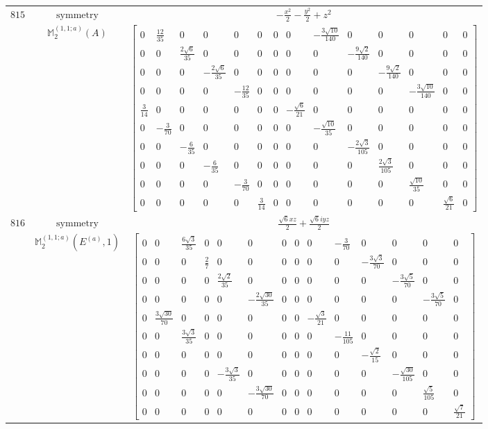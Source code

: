 \documentclass[fleqn,8pt,landscape]{jsarticle}
\begin{document}
\begin{longtable}{ccc}
$ 815 $ & $ \text{symmetry} $ & $ - \frac{x^{2}}{2} - \frac{y^{2}}{2} + z^{2} $ \\
$  $ & $ \mathbb{M}_{2}^{(1,1;a)}(A) $ & $ \begin{bmatrix} 0 & \frac{12}{35} & 0 & 0 & 0 & 0 & 0 & 0 & - \frac{3 \sqrt{10}}{140} & 0 & 0 & 0 & 0 & 0 \\ 0 & 0 & \frac{2 \sqrt{6}}{35} & 0 & 0 & 0 & 0 & 0 & 0 & - \frac{9 \sqrt{2}}{140} & 0 & 0 & 0 & 0 \\ 0 & 0 & 0 & - \frac{2 \sqrt{6}}{35} & 0 & 0 & 0 & 0 & 0 & 0 & - \frac{9 \sqrt{2}}{140} & 0 & 0 & 0 \\ 0 & 0 & 0 & 0 & - \frac{12}{35} & 0 & 0 & 0 & 0 & 0 & 0 & - \frac{3 \sqrt{10}}{140} & 0 & 0 \\ \frac{3}{14} & 0 & 0 & 0 & 0 & 0 & 0 & - \frac{\sqrt{6}}{21} & 0 & 0 & 0 & 0 & 0 & 0 \\ 0 & - \frac{3}{70} & 0 & 0 & 0 & 0 & 0 & 0 & - \frac{\sqrt{10}}{35} & 0 & 0 & 0 & 0 & 0 \\ 0 & 0 & - \frac{6}{35} & 0 & 0 & 0 & 0 & 0 & 0 & - \frac{2 \sqrt{3}}{105} & 0 & 0 & 0 & 0 \\ 0 & 0 & 0 & - \frac{6}{35} & 0 & 0 & 0 & 0 & 0 & 0 & \frac{2 \sqrt{3}}{105} & 0 & 0 & 0 \\ 0 & 0 & 0 & 0 & - \frac{3}{70} & 0 & 0 & 0 & 0 & 0 & 0 & \frac{\sqrt{10}}{35} & 0 & 0 \\ 0 & 0 & 0 & 0 & 0 & \frac{3}{14} & 0 & 0 & 0 & 0 & 0 & 0 & \frac{\sqrt{6}}{21} & 0 \end{bmatrix} $ \\ \hline
$ 816 $ & $ \text{symmetry} $ & $ \frac{\sqrt{6} x z}{2} + \frac{\sqrt{6} i y z}{2} $ \\
$  $ & $ \mathbb{M}_{2}^{(1,1;a)}(E^{(a)},1) $ & $ \begin{bmatrix} 0 & 0 & \frac{6 \sqrt{3}}{35} & 0 & 0 & 0 & 0 & 0 & 0 & - \frac{3}{70} & 0 & 0 & 0 & 0 \\ 0 & 0 & 0 & \frac{2}{7} & 0 & 0 & 0 & 0 & 0 & 0 & - \frac{3 \sqrt{3}}{70} & 0 & 0 & 0 \\ 0 & 0 & 0 & 0 & \frac{2 \sqrt{2}}{35} & 0 & 0 & 0 & 0 & 0 & 0 & - \frac{3 \sqrt{5}}{70} & 0 & 0 \\ 0 & 0 & 0 & 0 & 0 & - \frac{2 \sqrt{30}}{35} & 0 & 0 & 0 & 0 & 0 & 0 & - \frac{3 \sqrt{5}}{70} & 0 \\ 0 & \frac{3 \sqrt{30}}{70} & 0 & 0 & 0 & 0 & 0 & 0 & - \frac{\sqrt{3}}{21} & 0 & 0 & 0 & 0 & 0 \\ 0 & 0 & \frac{3 \sqrt{3}}{35} & 0 & 0 & 0 & 0 & 0 & 0 & - \frac{11}{105} & 0 & 0 & 0 & 0 \\ 0 & 0 & 0 & 0 & 0 & 0 & 0 & 0 & 0 & 0 & - \frac{\sqrt{2}}{15} & 0 & 0 & 0 \\ 0 & 0 & 0 & 0 & - \frac{3 \sqrt{3}}{35} & 0 & 0 & 0 & 0 & 0 & 0 & - \frac{\sqrt{30}}{105} & 0 & 0 \\ 0 & 0 & 0 & 0 & 0 & - \frac{3 \sqrt{30}}{70} & 0 & 0 & 0 & 0 & 0 & 0 & \frac{\sqrt{5}}{105} & 0 \\ 0 & 0 & 0 & 0 & 0 & 0 & 0 & 0 & 0 & 0 & 0 & 0 & 0 & \frac{\sqrt{7}}{21} \end{bmatrix} $ \\ \hline

\end{longtable}
\end{document}

